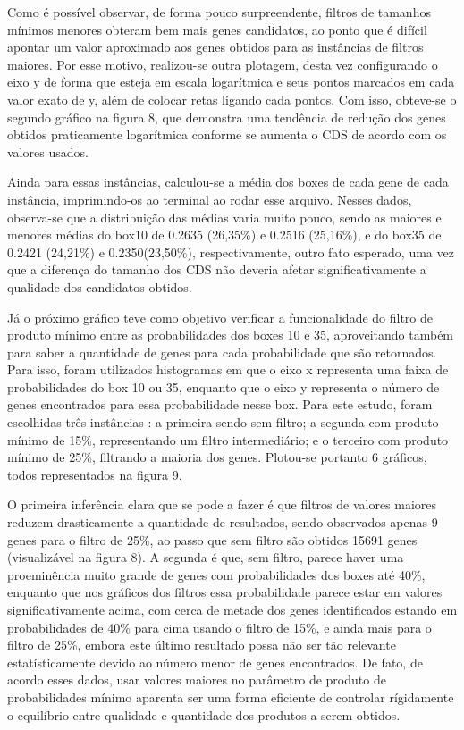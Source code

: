 \documentclass[brazilian,12pt,a4paper,final]{article}
\begin{document}
	Como é possível observar, de forma pouco surpreendente, filtros de tamanhos mínimos menores obteram bem mais genes candidatos, ao ponto que é difícil apontar um valor aproximado aos genes obtidos para as instâncias de filtros maiores. Por esse motivo, realizou-se outra plotagem, desta vez configurando o eixo y de forma que esteja em escala logarítmica e seus pontos marcados em cada valor exato de y, além de colocar retas ligando cada pontos. Com isso, obteve-se o segundo gráfico na figura 8, que demonstra uma tendência de redução dos genes obtidos praticamente logarítmica conforme se aumenta o CDS de acordo com os valores usados.
	
	Ainda para essas instâncias, calculou-se a média dos boxes de cada gene de cada instância, imprimindo-os ao terminal ao rodar esse arquivo. Nesses dados, observa-se que a distribuição das médias varia muito pouco, sendo as maiores e menores médias do box10 de 0.2635 (26,35\%) e 0.2516 (25,16\%), e do box35 de 0.2421 (24,21\%) e 0.2350(23,50\%), respectivamente, outro fato esperado, uma vez que a diferença do tamanho dos CDS não deveria afetar significativamente a qualidade dos candidatos obtidos.
	
	Já o próximo gráfico teve como objetivo verificar a funcionalidade do filtro de produto mínimo entre as probabilidades dos boxes 10 e 35, aproveitando também para saber a quantidade de genes para cada probabilidade que são retornados. Para isso, foram utilizados histogramas em que o eixo x representa uma faixa de probabilidades do box 10 ou 35, enquanto que o eixo y representa o número de genes encontrados para essa probabilidade nesse box. Para este estudo, foram escolhidas três instâncias : a primeira sendo sem filtro; a segunda com produto mínimo de 15\%, representando um filtro intermediário; e o terceiro com produto mínimo de 25\%, filtrando a maioria dos genes. Plotou-se portanto 6 gráficos, todos representados na figura 9.
	
	O primeira inferência clara que se pode a fazer é que filtros de valores maiores reduzem drasticamente a quantidade de resultados, sendo observados apenas 9 genes para o filtro de 25\%, ao passo que sem filtro são obtidos 15691 genes (visualizável na figura 8). A segunda é que, sem filtro, parece haver uma proeminência muito grande de genes com probabilidades dos boxes até 40\%, enquanto que nos gráficos dos filtros essa probabilidade parece estar em valores significativamente acima, com cerca de metade dos genes identificados estando em probabilidades de 40\% para cima usando o filtro de 15\%, e ainda mais para o filtro de 25\%, embora este último resultado possa não ser tão relevante estatísticamente devido ao número menor de genes encontrados. De fato, de acordo esses dados, usar valores maiores no parâmetro de produto de probabilidades mínimo aparenta ser uma forma eficiente de controlar rígidamente o equilíbrio entre qualidade e quantidade dos produtos a serem obtidos.
	
\end{document}
